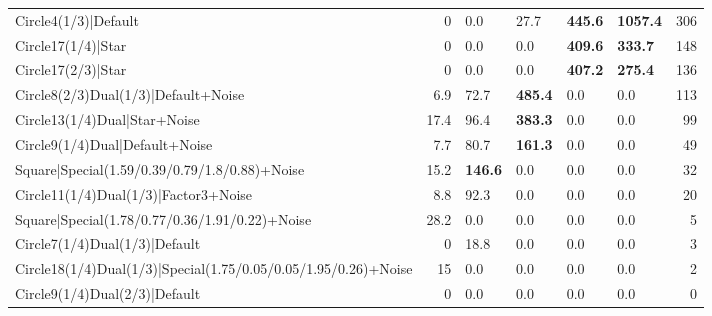 \begin{tabular}{lrllllr}
 Circle4(1/3)|Default                                           &          0   & 0.0            & 27.7            & \textbf{445.6}  & \textbf{1057.4} &          306 \\
 Circle17(1/4)|Star                                             &          0   & 0.0            & 0.0             & \textbf{409.6}  & \textbf{333.7}  &          148 \\
 Circle17(2/3)|Star                                             &          0   & 0.0            & 0.0             & \textbf{407.2}  & \textbf{275.4}  &          136 \\
 Circle8(2/3)Dual(1/3)|Default+Noise                            &          6.9 & 72.7           & \textbf{485.4}  & 0.0             & 0.0             &          113 \\
 Circle13(1/4)Dual|Star+Noise                                   &         17.4 & 96.4           & \textbf{383.3}  & 0.0             & 0.0             &           99 \\
 Circle9(1/4)Dual|Default+Noise                                 &          7.7 & 80.7           & \textbf{161.3}  & 0.0             & 0.0             &           49 \\
 Square|Special(1.59/0.39/0.79/1.8/0.88)+Noise                  &         15.2 & \textbf{146.6} & 0.0             & 0.0             & 0.0             &           32 \\
 Circle11(1/4)Dual(1/3)|Factor3+Noise                           &          8.8 & 92.3           & 0.0             & 0.0             & 0.0             &           20 \\
 Square|Special(1.78/0.77/0.36/1.91/0.22)+Noise                 &         28.2 & 0.0            & 0.0             & 0.0             & 0.0             &            5 \\
 Circle7(1/4)Dual(1/3)|Default                                  &          0   & 18.8           & 0.0             & 0.0             & 0.0             &            3 \\
 Circle18(1/4)Dual(1/3)|Special(1.75/0.05/0.05/1.95/0.26)+Noise &         15   & 0.0            & 0.0             & 0.0             & 0.0             &            2 \\
 Circle9(1/4)Dual(2/3)|Default                                  &          0   & 0.0            & 0.0             & 0.0             & 0.0             &            0 \\
\hline
\end{tabular}